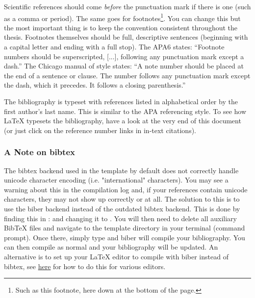 Scientific references should come \emph{before} the punctuation mark if there is one (such as a comma or period). The same goes for footnotes\footnote{Such as this footnote, here down at the bottom of the page.}. You can change this but the most important thing is to keep the convention consistent throughout the thesis. Footnotes themselves should be full, descriptive sentences (beginning with a capital letter and ending with a full stop). The APA6 states: \enquote{Footnote numbers should be superscripted, [...], following any punctuation mark except a dash.} The Chicago manual of style states: \enquote{A note number should be placed at the end of a sentence or clause. The number follows any punctuation mark except the dash, which it precedes. It follows a closing parenthesis.}

The bibliography is typeset with references listed in alphabetical order by the first author's last name. This is similar to the APA referencing style. To see how \LaTeX{} typesets the bibliography, have a look at the very end of this document (or just click on the reference number links in in-text citations).

\subsubsection{A Note on bibtex}

The bibtex backend used in the template by default does not correctly handle unicode character encoding (i.e. "international" characters). You may see a warning about this in the compilation log and, if your references contain unicode characters, they may not show up correctly or at all. The solution to this is to use the biber backend instead of the outdated bibtex backend. This is done by finding this in :  and changing it to . You will then need to delete all auxiliary BibTeX files and navigate to the template directory in your terminal (command prompt). Once there, simply type  and biber will compile your bibliography. You can then compile  as normal and your bibliography will be updated. An alternative is to set up your LaTeX editor to compile with biber instead of bibtex, see \href{http://tex.stackexchange.com/questions/154751/biblatex-with-biber-configuring-my-editor-to-avoid-undefined-citations/}{here} for how to do this for various editors.
